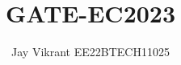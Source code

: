 \documentclass[journal,12pt,Twocolumn]{IEEEtran}
\theoremstyle{remark}
\begin{document}
%




\vspace{3cm}

\title{
GATE-EC2023
}
\author{ Jay Vikrant EE22BTECH11025
	
	
}	


%
%
%

% 
%



% 
\end{document}
